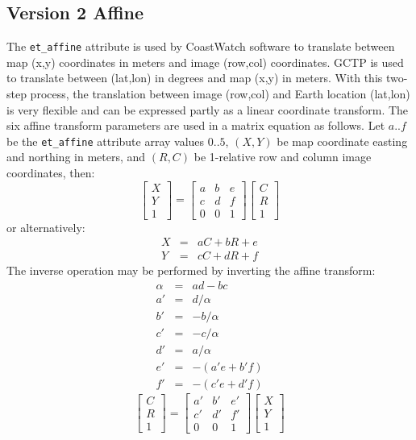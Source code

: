 \subsection{Version 2 Affine}

The {\tt et\_affine} attribute is used by CoastWatch software to
translate between map (x,y) coordinates in meters and image (row,col)
coordinates. GCTP is used to translate between (lat,lon) in degrees
and map (x,y) in meters. With this two-step process, the translation
between image (row,col) and Earth location (lat,lon) is very flexible
and can be expressed partly as a linear coordinate transform. The six
affine transform parameters are used in a matrix equation as follows.
Let $a..f$ be the {\tt et\_affine} attribute array values $0..5$,
$(X,Y)$ be map coordinate easting and northing in meters, and $(R,C)$
be 1-relative row and column image coordinates, then:
\[
  \left[ \begin{array}{c}
           X \\
           Y \\
           1
         \end{array}  
  \right]
  = 
  \left[ \begin{array}{ccc}
           a & b & e \\
           c & d & f \\
           0 & 0 & 1
         \end{array}
  \right]
  \left[ \begin{array}{c}
           C \\
           R \\
           1
         \end{array}
  \right]
\]
or alternatively:
\begin{eqnarray*}
  X & = & a C + b R + e \\
  Y & = & c C + d R + f
\end{eqnarray*}
The inverse operation may be performed by inverting the affine transform: 
\begin{eqnarray*}
  \alpha & = & ad - bc \\
   a' & = &  d / \alpha \\
   b' & = & -b / \alpha \\
   c' & = & -c / \alpha \\
   d' & = &  a / \alpha \\
   e' & = & -(a'e + b'f) \\
   f' & = & -(c'e + d'f)
\end{eqnarray*}
\[
  \left[ \begin{array}{c}
           C \\
           R \\
           1
         \end{array}  
  \right]
  = 
  \left[ \begin{array}{ccc}
           a' & b' & e' \\
           c' & d' & f' \\
           0 & 0 & 1
         \end{array}
  \right]
  \left[ \begin{array}{c}
           X \\
           Y \\
           1
         \end{array}
  \right]
\]
